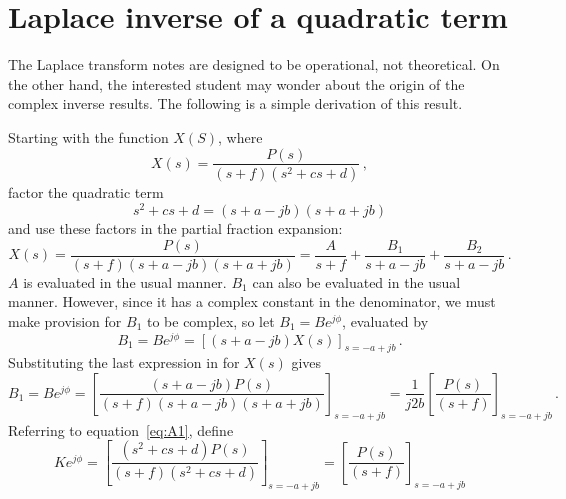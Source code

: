 \chapter{Laplace inverse of a quadratic term}

The Laplace transform notes are designed to be operational, not theoretical. On the other hand, the interested student may wonder about the origin of the complex inverse results. The following is a simple derivation of this result.

Starting with the function $X(S)$, where
\begin{equation}
X(s) = \frac{P(s)}{(s+f)(s^2+cs+d)}\,,
\label{eq:A1}
\end{equation}
factor the quadratic term
\begin{equation*}
s^2 + cs + d = (s+a-jb)(s+a+jb)
\end{equation*}
and use these factors in the partial fraction expansion: 
\begin{equation}
X(s) = \frac{P(s)}{(s+f)(s+a-jb)(s+a+jb)}  = \frac{A}{s+f} + \frac{B_1}{s+a-jb} + \frac{B_2}{s+a-jb}\,.
\end{equation}
$A$ is evaluated in the usual manner. $B_1$ can also be evaluated in the usual manner. However, since it has a complex constant in the denominator, we must make provision for $B_1$ to be complex, so let $B_1 = Be^{j\phi}$, evaluated by
\begin{equation}
B_1 = B e^{j\phi} = \left[ (s+a-jb) X(s) \right]_{s=-a+jb}\,.
\end{equation}
Substituting the last expression in for $X(s)$ gives
\begin{equation}
B_1 = Be^{j\phi} = \left[ \frac{(s+a-jb)P(s)}{(s+f)(s+a-jb)(s+a+jb)} \right]_{s=-a+jb} = \frac{1}{j2b} \left[\frac{P(s)}{(s+f)}\right]_{s=-a+jb}\,.
\end{equation}
Referring to equation~\ref{eq:A1}, define
\begin{equation}
Ke^{j\phi} = \left[ \frac{(s^2+cs+d)P(s)}{(s+f)(s^2+cs+d)}\right]_{s=-a+jb} = \left[\frac{P(s)}{(s+f)}\right]_{s=-a+jb}
\end{equation}

